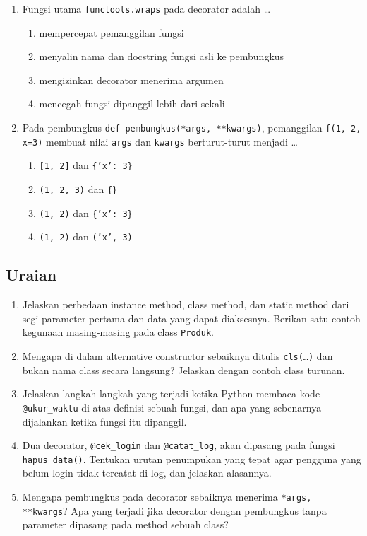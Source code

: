 \begin{enumerate}
  \item Fungsi utama \texttt{functools.wraps} pada decorator adalah \ldots
  \begin{enumerate}[label=\alph*.,itemsep=0pt]
    \item mempercepat pemanggilan fungsi
    \item menyalin nama dan docstring fungsi asli ke pembungkus
    \item mengizinkan decorator menerima argumen
    \item mencegah fungsi dipanggil lebih dari sekali
  \end{enumerate}

  \item Pada pembungkus \texttt{def pembungkus(*args, **kwargs)}, pemanggilan \texttt{f(1, 2, x=3)} membuat nilai \texttt{args} dan \texttt{kwargs} berturut-turut menjadi \ldots
  \begin{enumerate}[label=\alph*.,itemsep=0pt]
    \item \texttt{[1, 2]} dan \texttt{\{'x': 3\}}
    \item \texttt{(1, 2, 3)} dan \texttt{\{\}}
    \item \texttt{(1, 2)} dan \texttt{\{'x': 3\}}
    \item \texttt{(1, 2)} dan \texttt{('x', 3)}
  \end{enumerate}
\end{enumerate}

\subsection{Uraian}

\begin{enumerate}
  \item Jelaskan perbedaan instance method, class method, dan static method dari segi parameter pertama dan data yang dapat diaksesnya. Berikan satu contoh kegunaan masing-masing pada class \texttt{Produk}.
  \item Mengapa di dalam alternative constructor sebaiknya ditulis \texttt{cls(\ldots)} dan bukan nama class secara langsung? Jelaskan dengan contoh class turunan.
  \item Jelaskan langkah-langkah yang terjadi ketika Python membaca kode \texttt{@ukur\_waktu} di atas definisi sebuah fungsi, dan apa yang sebenarnya dijalankan ketika fungsi itu dipanggil.
  \item Dua decorator, \texttt{@cek\_login} dan \texttt{@catat\_log}, akan dipasang pada fungsi \texttt{hapus\_data()}. Tentukan urutan penumpukan yang tepat agar pengguna yang belum login tidak tercatat di log, dan jelaskan alasannya.
  \item Mengapa pembungkus pada decorator sebaiknya menerima \texttt{*args, **kwargs}? Apa yang terjadi jika decorator dengan pembungkus tanpa parameter dipasang pada method sebuah class?
\end{enumerate}

